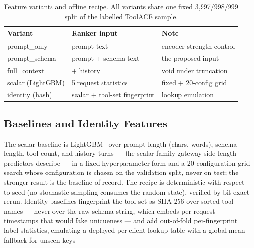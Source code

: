 \begin{table}[t]
  \caption{Feature variants and offline recipe. All variants share one fixed
  3{,}997/998/999 split of the labelled ToolACE sample.}
  \label{tab:variants}
  \centering\footnotesize
  \setlength{\tabcolsep}{3.5pt}
  \begin{tabular}{@{}lll@{}}
    \toprule
    Variant & Ranker input & Note \\
    \midrule
    prompt\_only & prompt text & encoder-strength control \\
    prompt\_schema & prompt + schema text & the proposed input \\
    full\_context & + history & void under truncation \\
    \midrule
    scalar (LightGBM) & 5 request statistics & fixed + 20-config grid \\
    identity (hash) & scalar + tool-set fingerprint & lookup emulation \\
    \bottomrule
  \end{tabular}
\end{table}

\subsection{Baselines and Identity Features}
The scalar baseline is LightGBM~\cite{lightgbm} over prompt length (chars,
words),
schema length, tool count, and history turns --- the scalar family
gateway-side length predictors describe --- in a fixed-hyperparameter form and a 20-configuration
grid search whose configuration is chosen on the validation split, never on
test; the stronger result is the baseline of record. The recipe is
deterministic with respect to seed (no stochastic sampling consumes the
random state), verified by bit-exact rerun. Identity baselines fingerprint
the tool set as SHA-256 over sorted tool names --- never over the raw schema
string, which embeds per-request timestamps that would fake uniqueness ---
and add out-of-fold per-fingerprint label statistics, emulating a deployed
per-client lookup table with a global-mean fallback for unseen keys.

